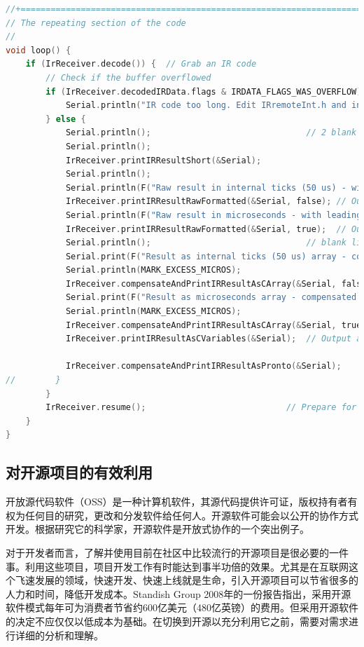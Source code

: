 \begin{lstlisting}[language=C,title=代码4-1: Arduino的红外解码程序]
//+=============================================================================
// The repeating section of the code
//
void loop() {
	if (IrReceiver.decode()) {  // Grab an IR code
		// Check if the buffer overflowed
		if (IrReceiver.decodedIRData.flags & IRDATA_FLAGS_WAS_OVERFLOW) {
			Serial.println("IR code too long. Edit IRremoteInt.h and increase RAW_BUFFER_LENGTH");
		} else {
			Serial.println();                               // 2 blank lines between entries
			Serial.println();
			IrReceiver.printIRResultShort(&Serial);
			Serial.println();
			Serial.println(F("Raw result in internal ticks (50 us) - with leading gap"));
			IrReceiver.printIRResultRawFormatted(&Serial, false); // Output the results in RAW format
			Serial.println(F("Raw result in microseconds - with leading gap"));
			IrReceiver.printIRResultRawFormatted(&Serial, true);  // Output the results in RAW format
			Serial.println();                               // blank line between entries
			Serial.print(F("Result as internal ticks (50 us) array - compensated with MARK_EXCESS_MICROS="));
			Serial.println(MARK_EXCESS_MICROS);
			IrReceiver.compensateAndPrintIRResultAsCArray(&Serial, false); // Output the results as uint8_t source code array of ticks
			Serial.print(F("Result as microseconds array - compensated with MARK_EXCESS_MICROS="));
			Serial.println(MARK_EXCESS_MICROS);
			IrReceiver.compensateAndPrintIRResultAsCArray(&Serial, true); // Output the results as uint16_t source code array of micros
			IrReceiver.printIRResultAsCVariables(&Serial);  // Output address and data as source code variables

			IrReceiver.compensateAndPrintIRResultAsPronto(&Serial);
//        }
		}
		IrReceiver.resume();                            // Prepare for the next value
	}
}
\end{lstlisting}

\subsection{对开源项目的有效利用}

开放源代码软件（OSS）是一种计算机软件，其源代码提供许可证，版权持有者有权为任何目的研究，更改和分发软件给任何人。开源软件可能会以公开的协作方式开发。根据研究它的科学家，开源软件是开放式协作的一个突出例子。

对于开发者而言，了解并使用目前在社区中比较流行的开源项目是很必要的一件事。利用这些项目，项目开发工作有时能达到事半功倍的效果。尤其是在互联网这个飞速发展的领域，快速开发、快速上线就是生命，引入开源项目可以节省很多的人力和时间，降低开发成本。Standish Group 2008年的一份报告指出，采用开源软件模式每年可为消费者节省约600亿美元（480亿英镑）的费用。但采用开源软件的决定不应仅仅以低成本为基础。在切换到开源以充分利用它之前，需要对需求进行详细的分析和理解。

